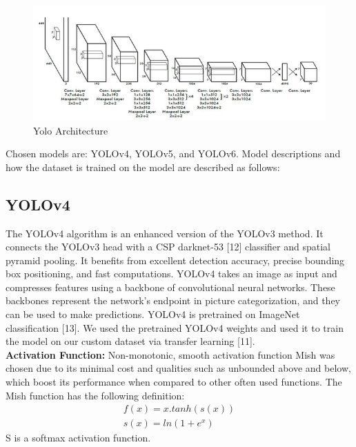 \begin{figure}[H]
    \centering
    \includegraphics[scale=0.7]{40_Chapter_4/YOLO-architecture-YOLO-architecture-is-inspired-by-GooLeNet-model-for-image_W640.jpg}
    \caption{Yolo Architecture}
    \label{Architecture}
\end{figure}
Chosen models are: YOLOv4, YOLOv5, and YOLOv6. Model descriptions and how the dataset is trained on the model are described as follows: \\
\subsection{YOLOv4} The YOLOv4 algorithm is an enhanced version of the YOLOv3 method. It connects the YOLOv3 head with a CSP darknet-53 [12] classifier and spatial pyramid pooling. It benefits from excellent detection accuracy, precise bounding box positioning, and fast computations. YOLOv4 takes an image as input and compresses features using a backbone of convolutional neural networks. These backbones represent the network's endpoint in picture categorization, and they can be used to make predictions. YOLOv4 is pretrained on ImageNet classification [13]. We used the pretrained YOLOv4 weights and used it to train the model on our custom dataset via transfer learning [11].\\
\textbf{Activation Function: } Non-monotonic, smooth activation function Mish was chosen due to its minimal cost and qualities such as unbounded above and below, which boost its performance when compared to other often used functions. The Mish function has the following definition:
\begin{align*}
f(x)=x.tanh\left ( s\left ( x \right ) \right )\\
s(x)=ln\left (1+e^x \right )
\end{align*}
S is a softmax activation function.\\
